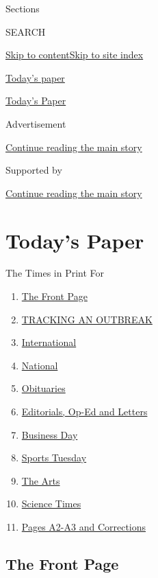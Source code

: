 Sections

SEARCH

\protect\hyperlink{site-content}{Skip to
content}\protect\hyperlink{site-index}{Skip to site index}

\href{https://www.nytimes3xbfgragh.onion/section/todayspaper}{Today's
paper}

\href{https://myaccount.nytimes3xbfgragh.onion/auth/login?response_type=cookie\&client_id=vi}{}

\href{https://www.nytimes3xbfgragh.onion/section/todayspaper}{Today's
Paper}

Advertisement

\protect\hyperlink{after-top}{Continue reading the main story}

Supported by

\protect\hyperlink{after-sponsor}{Continue reading the main story}

\hypertarget{todays-paper}{%
\section{Today's Paper}\label{todays-paper}}

The Times in Print For

\begin{enumerate}
\def\labelenumi{\arabic{enumi}.}
\tightlist
\item
  \protect\hyperlink{thefrontpage}{The Front Page}
\item
  \protect\hyperlink{trackinganoutbreak}{TRACKING AN OUTBREAK}
\item
  \protect\hyperlink{international}{International}
\item
  \protect\hyperlink{national}{National}
\item
  \protect\hyperlink{obituaries}{Obituaries}
\item
  \protect\hyperlink{editorialsux2cop-edandletters}{Editorials, Op-Ed
  and Letters}
\item
  \protect\hyperlink{businessday}{Business Day}
\item
  \protect\hyperlink{sportstuesday}{Sports Tuesday}
\item
  \protect\hyperlink{thearts}{The Arts}
\item
  \protect\hyperlink{sciencetimes}{Science Times}
\item
  \protect\hyperlink{pagesa2-a3andcorrections}{Pages A2-A3 and
  Corrections}
\end{enumerate}

\hypertarget{the-front-page}{%
\subsection{The Front Page}\label{the-front-page}}


